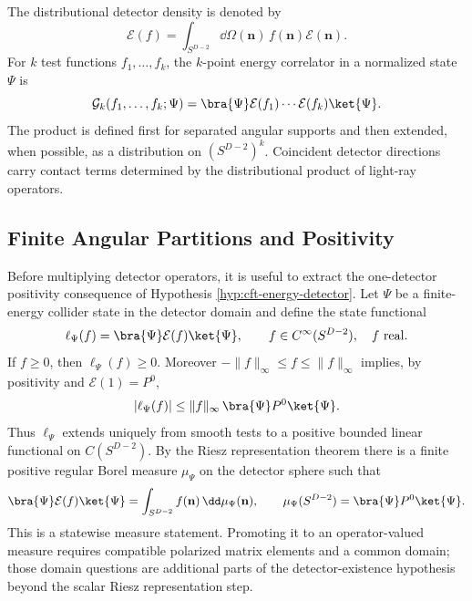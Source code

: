 The distributional detector density is denoted by
\[
  \mathcal E(f)
  =
  \int_{S^{D-2}}\dd\Omega(\mathbf n)\,
  f(\mathbf n)\mathcal E(\mathbf n).
\]
For \(k\) test functions \(f_1,\ldots,f_k\), the \(k\)-point energy correlator
in a normalized state \(\Psi\) is
\begin{equation}
  \mathcal G_k(f_1,\ldots,f_k;\Psi)
  =
  \bra{\Psi}\mathcal E(f_1)\cdots\mathcal E(f_k)\ket{\Psi}.
  \label{eq:cft-energy-correlator}
\end{equation}
The product is defined first for separated angular supports and then extended,
when possible, as a distribution on \((S^{D-2})^k\).  Coincident detector
directions carry contact terms determined by the distributional product of
light-ray operators.

\subsection{Finite Angular Partitions and Positivity}
\label{subsec:cft-detector-finite-partitions-positivity}

Before multiplying detector operators, it is useful to extract the
one-detector positivity consequence of Hypothesis
\ref{hyp:cft-energy-detector}.  Let \(\Psi\) be a finite-energy collider
state in the detector domain and define the state functional
\[
  \ell_\Psi(f)
  =
  \bra{\Psi}\mathcal E(f)\ket{\Psi},
  \qquad f\in C^\infty(S^{D-2}),\quad f\ {\rm real}.
\]
If \(f\geq0\), then \(\ell_\Psi(f)\geq0\).  Moreover
\(-\|f\|_\infty\leq f\leq\|f\|_\infty\) implies, by positivity and
\(\mathcal E(1)=P^0\),
\begin{equation}
  |\ell_\Psi(f)|
  \leq
  \|f\|_\infty\,\bra{\Psi}P^0\ket{\Psi}.
  \label{eq:cft-detector-riesz-bound}
\end{equation}
Thus \(\ell_\Psi\) extends uniquely from smooth tests to a positive bounded
linear functional on \(C(S^{D-2})\).  By the Riesz representation theorem
there is a finite positive regular Borel measure \(\mu_\Psi\) on the detector
sphere such that
\begin{equation}
  \bra{\Psi}\mathcal E(f)\ket{\Psi}
  =
  \int_{S^{D-2}} f(\mathbf n)\,\dd\mu_\Psi(\mathbf n),
  \qquad
  \mu_\Psi(S^{D-2})=\bra{\Psi}P^0\ket{\Psi}.
  \label{eq:cft-statewise-detector-measure}
\end{equation}
This is a statewise measure statement.  Promoting it to an
operator-valued measure requires compatible polarized matrix elements and a
common domain; those domain questions are additional parts of the
detector-existence hypothesis beyond the scalar Riesz representation step.


